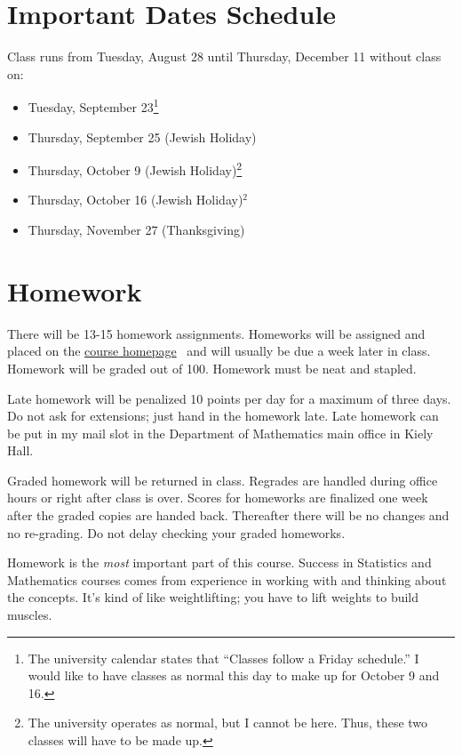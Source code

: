 \documentclass[12pt]{article}
\newcommand{\coursewebpage}{\href{https://github.com/kapelner/QC_Math_241_Fall_2014_15}{course homepage}}
\begin{document}
\section*{Important Dates Schedule}

Class runs from Tuesday, August 28 until Thursday, December 11 without class on:

\begin{itemize}
\itemsep -0.0em 
\item Tuesday, September 23\footnote{The university calendar states that ``Classes follow a Friday schedule.'' I would like to have classes as normal this day to make up for October 9 and 16.}
\item Thursday, September 25 (Jewish Holiday)
\item Thursday, October 9 (Jewish Holiday)\footnote{The university operates as normal, but I cannot be here. Thus, these two classes will have to be made up.}
\item Thursday, October 16 (Jewish Holiday)$^2$
\item Thursday, November 27 (Thanksgiving)
\end{itemize}


\section*{Homework}

There will be 13-15 homework assignments. Homeworks will be assigned and placed on the \coursewebpage~ and will usually be due a week later in class. Homework will be graded out of 100. Homework must be neat and stapled. 

Late homework will be penalized 10 points per day for a maximum of three days. Do not ask for extensions; just hand in the homework late. Late homework can be put in my mail slot in the Department of Mathematics main office in Kiely Hall.

Graded homework will be returned in class. Regrades are handled during office hours or right after class is over. Scores for homeworks are finalized one week after the graded copies are handed back. Thereafter there will be no changes and no re-grading. Do not delay checking your graded homeworks.

Homework is the \textit{most} important part of this course. Success in Statistics and Mathematics courses comes from experience in working with and thinking about the concepts. It's kind of like weightlifting; you have to lift weights to build muscles.
\end{document}
